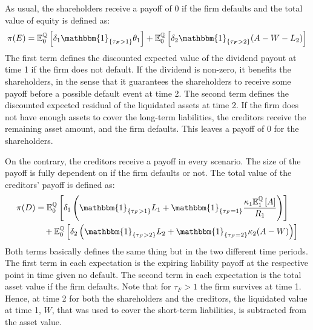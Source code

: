 \documentclass[main.tex]{subfiles}
\begin{document}
        As usual, the shareholders receive a payoff of 0 if the firm defaults and
        the total value of equity is defined as:
        \begin{equation*}
            \pi(E)=
            \mathbb{E}_{0}^{\rnmeasure}\left[
                \delta_1\mathbbm{1}_{\{\tau_{F}>1\}} \theta_1
            \right]
            +
            \mathbb{E}_{0}^{\rnmeasure}\left[
                \delta_{2}\mathbbm{1}_{\{\tau_{F}>2\}} (A-W-L_{2})
            \right]
        \end{equation*}
        The first term defines the discounted expected value of the dividend payout at time 1 if the firm does not default.
        If the dividend is non-zero, it benefits the shareholders,
        in the sense that it guarantees the shareholders to receive some payoff before a possible default event at time 2.
        The second term defines the discounted expected residual of the liquidated assets at time 2.
        If the firm does not have enough assets to cover the long-term liabilities, the creditors receive the remaining asset amount,
        and the firm defaults.
        This leaves a payoff of 0 for the shareholders.

        On the contrary, the creditors receive a payoff in every scenario.
        The size of the payoff is fully dependent on if the firm defaults or not.
        The total value of the creditors' payoff is defined as:
        \begin{align*}
            \pi(D)&=
            \mathbb{E}_{0}^{\rnmeasure}\left[
                \delta_1
                \left(\mathbbm{1}_{\{\tau_{F}>1\}} L_1 + \mathbbm{1}_{\{\tau_{F}=1\}} 
                \frac{
                    \kappa_1 \mathbb{E}_{1}^{\rnmeasure}\left[A\right]
                }{
                    R_1
                }
                \right)
            \right]
            \nonumber
            \\
            &\quad+
            \mathbb{E}_{0}^{\rnmeasure}\left[
                \delta_{2}
                \left(\mathbbm{1}_{\{\tau_{F}>2\}}L_{2}
                +
                \mathbbm{1}_{\{\tau_{F}=2\}}\kappa_{2}(A-W)
                \right)
            \right]
        \end{align*}
        Both terms basically defines the same thing but in the two different time periods.
        The first term in each expectation is the expiring liability payoff at the respective point in time given no default.
        The second term in each expectation is the total asset value if the firm defaults.
        Note that for $\tau_{F}>1$ the firm survives at time 1.
        Hence, at time 2 for both the shareholders and the creditors, the liquidated value at time 1, $W$,
        that was used to cover the short-term liabilities, is subtracted from the asset value.
\end{document}
